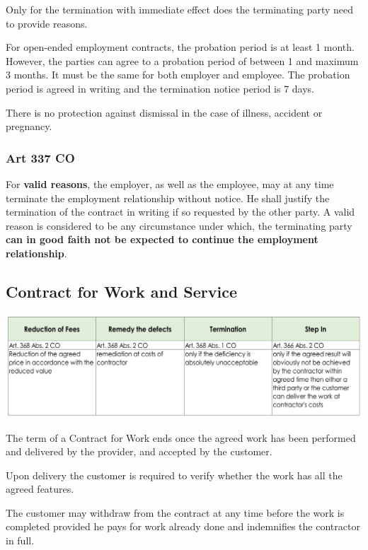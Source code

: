 \documentclass[11pt]{article}
\theoremstyle{definition}
\begin{document}
Only for the termination with immediate effect does the terminating party need to provide reasons.

For open-ended employment contracts, the probation period is at least 1 month. However, the parties can agree to a probation period of between 1 and maximum 3 months. It must be the same for both employer and employee. The probation period is agreed in writing and the termination notice period is 7 days.

There is no protection against dismissal in the case of illness, accident or pregnancy.

\subsubsection{Art 337 CO}
For \textbf{valid reasons}, the employer, as well as the employee, may at any time terminate the employment relationship without notice. He shall justify the termination of the contract in writing if so requested by the other party.
A valid reason is considered to be any circumstance under which, the terminating party \textbf{can in good faith not be expected to continue the employment relationship}.

\subsection{Contract for Work and Service}
\begin{center}
	\includegraphics[width=0.9\linewidth]{img/type_contracts_service}
\end{center}
The term of a Contract for Work ends once the agreed work has been performed and delivered by the provider, and accepted by the customer.

Upon delivery the customer is required to verify whether the work has all the agreed features.

The customer may withdraw from the contract at any time before the work is completed provided he pays for work already done and indemnifies the contractor in full.
\end{document}
